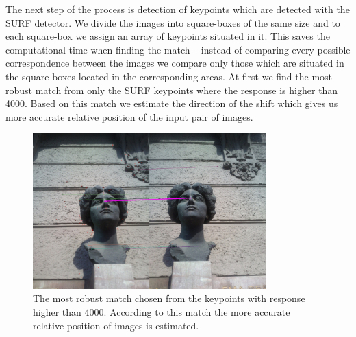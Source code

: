 The next step of the process is detection of keypoints which are detected with the SURF detector.
We divide the images into square-boxes of the same size and to each square-box we assign an array of keypoints situated in it.
This saves the computational time when finding the match -- instead of comparing every possible correspondence between the images we compare only those which are situated in the square-boxes located in the corresponding areas.
At first we find the most robust match from only the SURF keypoints where the response is higher than 4000.
Based on this match we estimate the direction of the shift which gives us more accurate relative position of the input pair of images.


\begin{figure}[H]
\centerline{
\includegraphics[width=9cm]{img/ema_direction.png}}
\caption{The most robust match chosen from the keypoints with response higher than 4000. According to this match the more accurate relative position of images is estimated.}
\label{fig:robust_match}
\end{figure}

